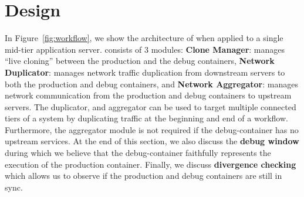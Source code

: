 \section{Design}
\label{sec:design}

In Figure~\ref{fig:workflow}, we show the architecture of \parikshan when applied to a single mid-tier application server.
\parikshan consists of 3 modules: 
\textbf{Clone Manager}: manages ``live cloning'' between the production and the debug containers, 
\textbf{Network Duplicator}: manages network traffic duplication from downstream servers to both the production and debug containers, 
and \textbf{Network Aggregator}: manages network communication from the production and debug containers to upstream servers.
The duplicator, and aggregator can be used to target multiple connected tiers of a system by duplicating traffic at the beginning and end of a workflow.
Furthermore, the aggregator module is not required if the debug-container has no upstream services. 
At the end of this section, we also discuss the \textbf{debug window} during which we believe that the debug-container faithfully represents the execution of the production container.
Finally, we discuss \textbf{divergence checking} which allows us to observe if the production and debug containers are still in sync.


